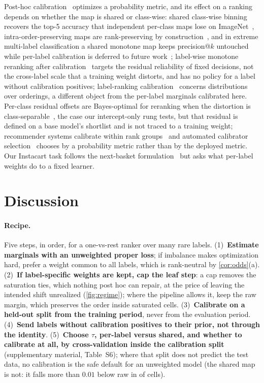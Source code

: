\documentclass[runningheads]{llncs}
\newcommand{\Supp}[1]{supplementary material, #1}  %
\begin{document}
Post-hoc calibration~\cite{Platt1999,Zadrozny2002,NiculescuMizil2005,Kull2017Beta,Guo2017Calibration} optimizes a probability metric, and its effect on a ranking depends on whether the map is shared or class-wise: shared class-wise binning recovers the top-5 accuracy that independent per-class maps lose on ImageNet~\cite{Patel2021IMax}, intra-order-preserving maps are rank-preserving by construction~\cite{Rahimi2020IntraOrder}, and in extreme multi-label classification a shared monotone map keeps precision@$k$ untouched while per-label calibration is deferred to future work~\cite{Ullah2025XMLCCalib}; label-wise monotone reranking after calibration~\cite{Tae2026MRP} targets the residual reliability of fixed decisions, not the cross-label scale that a training weight distorts, and has no policy for a label without calibration positives; label-ranking calibration~\cite{Thies2026LabelRankingCalib} concerns distributions over orderings, a different object from the per-label marginals calibrated here. Per-class residual offsets are Bayes-optimal for reranking when the distortion is class-separable~\cite{Wang2026BeyondLA}, the case our intercept-only rung tests, but that residual is defined on a base model's shortlist and is not traced to a training weight; recommender systems calibrate within rank groups~\cite{Sato2024TopN} and automated calibrator selection~\cite{Abdelrahman2025SmartCal} chooses by a probability metric rather than by the deployed metric. Our Instacart task follows the next-basket formulation~\cite{Yu2016DREAM,Li2023NBRRealityCheck,Hu2020TIFUKNN,Ariannezhad2022ReCANet} but asks what per-label weights do to a fixed learner.

\section{Discussion}
\label{sec:discussion}

\paragraph{Recipe.} Five steps, in order, for a one-vs-rest ranker over many rare labels. (1)~\textbf{Estimate marginals with an unweighted proper loss}; if imbalance makes optimization hard, prefer a weight common to all labels, which is rank-neutral by \cref{cor:odds}(a). (2)~\textbf{If label-specific weights are kept, cap the leaf step}: a cap removes the saturation ties, which nothing post hoc can repair, at the price of leaving the intended shift unrealized (\cref{fig:regime}); where the pipeline allows it, keep the raw margin, which preserves the order inside saturated cells. (3)~\textbf{Calibrate on a held-out split from the training period}, never from the evaluation period. (4)~\textbf{Send labels without calibration positives to their prior, not through the identity}. (5)~\textbf{Choose $\tau$, per-label versus shared, and whether to calibrate at all, by cross-validation inside the calibration split} (\Supp{Table~S6}); where that split does not predict the test data, no calibration is the safe default for an unweighted model (the shared map is not: it falls more than $0.01$ below raw in \nnSharedBelowRaw{} of \nnTauCells{} cells).
\end{document}
